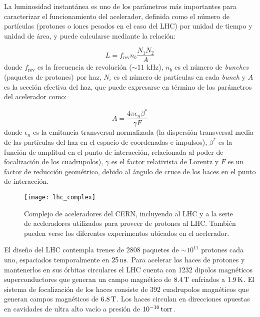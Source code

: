 La luminosidad instantánea es uno de los parámetros más importantes para
caracterizar el funcionamiento del acelerador, definida como el número de
partículas (protones o iones pesados en el caso del LHC) por unidad de tiempo y unidad de
área, y puede calcularse mediante la relación:

\begin{equation}
  L = f_\text{rev} n_b \frac{N_1 N_2}{A}
\end{equation}
%
donde $f_\text{rev}$ es la frecuencia de revolución ($\sim 11$ kHz), $n_b$ es el número de
\emph{bunches} (paquetes de protones) por haz, $N_i$ es el número de partículas
en cada \emph{bunch} y $A$ es la sección efectiva del haz, que puede expresarse en
término de los parámetros del acelerador como:

\begin{equation}
  A = \frac{4\pi \epsilon_n \beta^{*}}{\gamma F}
\end{equation}
%
donde $\epsilon_n$ es la emitancia transversal normalizada (la dispersión
transversal media de las partículas del haz en el espacio de coordenadas e
impulsos), $\beta^{*}$ es la función de amplitud en el punto de interacción,
relacionada al poder de focalización de los cuadrupolos), $\gamma$ es el
factor relativista de Lorentz y $F$ es un factor de reducción geométrico, debido
al ángulo de cruce de los haces en el punto de interacción.

\begin{figure}[!htb]
  \centering

  \texttt{[image: lhc\_complex]}

  \caption{Complejo de aceleradores del CERN, incluyendo al LHC y a la serie
    de aceleradores utilizados para proveer de protones al LHC. También pueden verse
    los diferentes experimentos ubicados en el acelerador.}
  \label{fig:lhc_complex}

\end{figure}

El diseño del LHC contempla trenes de 2808 paquetes de $\sim 10^{11}$ protones cada uno,
espaciados temporalmente en $\unit[25]{ns}$.
Para acelerar los haces de protones y mantenerlos en sus órbitas circulares el
LHC cuenta con 1232 dipolos magnéticos superconductores que generan un campo
magnético de $\unit[8.4]{T}$ enfriados a $\unit[1.9]{K}$. El sistema de focalización de los haces
consiste de 392 cuadrupolos magnéticos que generan campos magnéticos de $\unit[6.8]{T}$.
Los haces circulan en direcciones opuestas en cavidades de ultra alto vacío
a presión de $\unit[10^{-10}]{torr}$.


